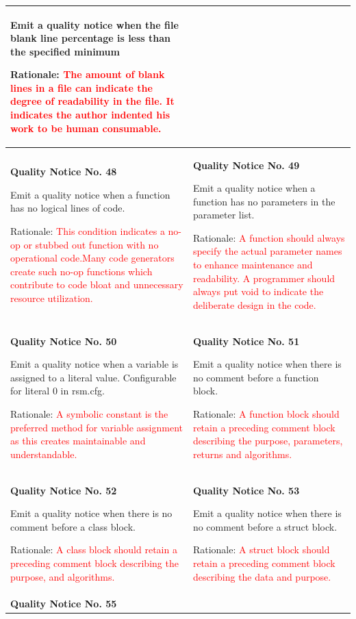 {\begin{longtable}{||p{}|p{}||}
Emit a quality notice when the file blank line percentage is less than the specified minimum

Rationale: \textcolor{red}{The amount of blank lines in a file can indicate the degree of readability in the file. It indicates the author indented his work to be human consumable.}
    \\
    \hline
        \textbf{Quality Notice No. 48}
        
Emit a quality notice when a function has no logical lines of code. 
 
Rationale: \textcolor{red}{This condition indicates a no-op or stubbed out function with no operational code.Many code generators create such no-op functions which contribute to code bloat and unnecessary resource utilization.}
 & \textbf{Quality Notice No. 49}
 
Emit a quality notice when a function has no parameters in the parameter list.

Rationale:  \textcolor{red}{A function should always specify the actual parameter names to enhance maintenance and readability. A programmer should always put void to indicate the deliberate design in the code.}
    \\
    \hline
        \textbf{Quality Notice No. 50}
         
Emit a quality notice when a variable is assigned to a literal value. Configurable for literal 0 in rsm.cfg. 

Rationale: \textcolor{red}{A symbolic constant is the preferred method for variable assignment as this creates maintainable and understandable.}
 & \textbf{Quality Notice No. 51}
 
Emit a quality notice when there is no comment before a function block. 
 
Rationale: \textcolor{red}{A function block should retain a preceding comment block describing the purpose, parameters, returns and algorithms.}
    \\
    \hline
     \textbf{Quality Notice No. 52}
     
Emit a quality notice when there is no comment before a class block. 
 
Rationale: \textcolor{red}{A class block should retain a preceding comment block describing the purpose, and algorithms.}
 & \textbf{Quality Notice No. 53}
 
Emit a quality notice when there is no comment before a struct block. 

Rationale: \textcolor{red}{A struct block should retain a preceding comment block describing the data and purpose.}
    \\
    \hline
     \textbf{Quality Notice No. 55}
     

\end{longtable}}
